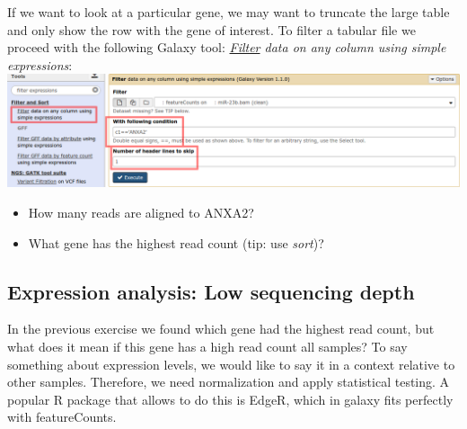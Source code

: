 If we want to look at a particular gene, we may want to truncate the large table and only show the row with the gene of interest.
To filter a tabular file we proceed with the following Galaxy tool: 
\textit{\underline{Filter} data on any column using simple expressions}:\\
\includegraphics[width=\textwidth]{figures/expression_02.png}\\
\begin{itemize}
	\item How many reads are aligned to ANXA2?
	\item What gene has the highest read count (tip: use \textit{sort})?
\end{itemize}

\subsection{Expression analysis: Low sequencing depth}
In the previous exercise we found which gene had the highest read count, but what does it mean if this gene has a high read count all samples?
To say something about expression levels, we would like to say it in a context relative to other samples.
Therefore, we need normalization and apply statistical testing.
A popular R package that allows to do this is EdgeR, which in galaxy fits perfectly with featureCounts.

